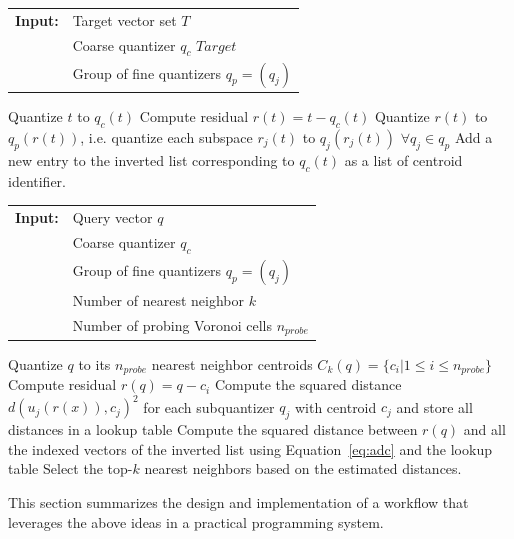 \documentclass[twoside,a4paper]{master}
\begin{document}
\begin{algorithm}
\caption{Index building steps in IVFADC}
\label{code:index_ivfadc}
\begin{tabular}{@{}l@{~}l}
\textbf{Input:}&Target vector set \(T\)\\
               &Coarse quantizer \(q_c\) \(Target\) \\
               &Group of fine quantizers \(q_p = (q_j)\)
\end{tabular}
\begin{algorithmic}
\State Quantize \(t\) to \(q_c(t)\)
\State Compute residual \(r(t) = t - q_c(t)\)
\State Quantize \(r(t)\) to \(q_p(r(t))\), i.e. quantize each subspace \(r_j(t)\) to \(q_j(r_j(t))\) \(\forall q_j \in q_p\)
\State Add a new entry to the inverted list corresponding to \(q_c(t)\) as a list of centroid identifier.
\EndFor
\end{algorithmic}
\end{algorithm}

\begin{algorithm}
\caption{Search algorithm in IVFADC}
\label{code:query_ivfadc}
\begin{tabular}{@{}l@{~}l}
\textbf{Input:}&Query vector \(q\)\\
               &Coarse quantizer \(q_c\)\\
               &Group of fine quantizers \(q_p = (q_j)\) \\
               &Number of nearest neighbor \(k\) \\
               &Number of probing Voronoi cells \(n_{probe}\)
\end{tabular}
\begin{algorithmic}
\State Quantize \(q\) to its \(n_{probe}\) nearest neighbor centroids \(C_k(q) = \{c_i|1\leq i\leq n_{probe}\}\)
\State Compute residual \(r(q) = q - c_i\)
\State Compute the squared distance \(d(u_j(r(x)), c_{j})^2\) for each subquantizer \(q_j\) with centroid \(c_j\) and store all distances in a lookup table
\State Compute the squared distance between \(r(q)\) and all the indexed vectors of the inverted list using Equation~\ref{eq:adc} and the lookup table
\State Select the top-\(k\) nearest neighbors based on the estimated distances.
\EndFor
\end{algorithmic}
\end{algorithm}

This section summarizes the design and implementation of a workflow that leverages the above ideas in a practical programming system.
\end{document}
